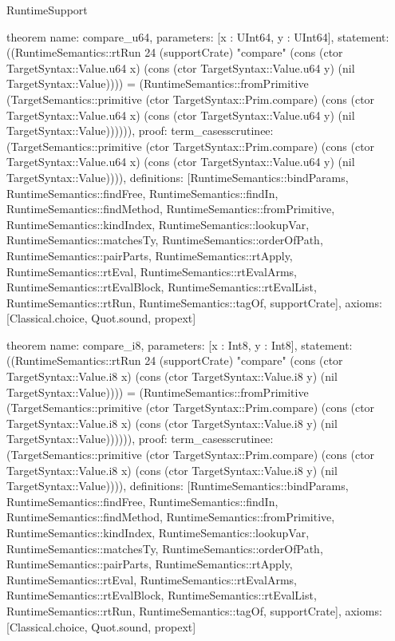 \begin{lexlean}{RuntimeSupport}
\begin{semanticmodule}
theorem{
  name: compare_u64,
  parameters: [x : UInt64, y : UInt64],
  statement: ((RuntimeSemantics::rtRun 24 (supportCrate) "compare" (cons (ctor TargetSyntax::Value.u64 x) (cons (ctor TargetSyntax::Value.u64 y) (nil TargetSyntax::Value)))) = (RuntimeSemantics::fromPrimitive (TargetSemantics::primitive (ctor TargetSyntax::Prim.compare) (cons (ctor TargetSyntax::Value.u64 x) (cons (ctor TargetSyntax::Value.u64 y) (nil TargetSyntax::Value)))))),
  proof: term_cases{scrutinee: (TargetSemantics::primitive (ctor TargetSyntax::Prim.compare) (cons (ctor TargetSyntax::Value.u64 x) (cons (ctor TargetSyntax::Value.u64 y) (nil TargetSyntax::Value)))), definitions: [RuntimeSemantics::bindParams, RuntimeSemantics::findFree, RuntimeSemantics::findIn, RuntimeSemantics::findMethod, RuntimeSemantics::fromPrimitive, RuntimeSemantics::kindIndex, RuntimeSemantics::lookupVar, RuntimeSemantics::matchesTy, RuntimeSemantics::orderOfPath, RuntimeSemantics::pairParts, RuntimeSemantics::rtApply, RuntimeSemantics::rtEval, RuntimeSemantics::rtEvalArms, RuntimeSemantics::rtEvalBlock, RuntimeSemantics::rtEvalList, RuntimeSemantics::rtRun, RuntimeSemantics::tagOf, supportCrate]},
  axioms: [Classical.choice, Quot.sound, propext]
}

theorem{
  name: compare_i8,
  parameters: [x : Int8, y : Int8],
  statement: ((RuntimeSemantics::rtRun 24 (supportCrate) "compare" (cons (ctor TargetSyntax::Value.i8 x) (cons (ctor TargetSyntax::Value.i8 y) (nil TargetSyntax::Value)))) = (RuntimeSemantics::fromPrimitive (TargetSemantics::primitive (ctor TargetSyntax::Prim.compare) (cons (ctor TargetSyntax::Value.i8 x) (cons (ctor TargetSyntax::Value.i8 y) (nil TargetSyntax::Value)))))),
  proof: term_cases{scrutinee: (TargetSemantics::primitive (ctor TargetSyntax::Prim.compare) (cons (ctor TargetSyntax::Value.i8 x) (cons (ctor TargetSyntax::Value.i8 y) (nil TargetSyntax::Value)))), definitions: [RuntimeSemantics::bindParams, RuntimeSemantics::findFree, RuntimeSemantics::findIn, RuntimeSemantics::findMethod, RuntimeSemantics::fromPrimitive, RuntimeSemantics::kindIndex, RuntimeSemantics::lookupVar, RuntimeSemantics::matchesTy, RuntimeSemantics::orderOfPath, RuntimeSemantics::pairParts, RuntimeSemantics::rtApply, RuntimeSemantics::rtEval, RuntimeSemantics::rtEvalArms, RuntimeSemantics::rtEvalBlock, RuntimeSemantics::rtEvalList, RuntimeSemantics::rtRun, RuntimeSemantics::tagOf, supportCrate]},
  axioms: [Classical.choice, Quot.sound, propext]
}


\end{semanticmodule}
\end{lexlean}
